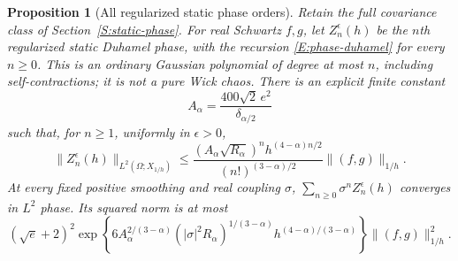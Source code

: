 \documentclass[12pt]{article}
\numberwithin{equation}{section}
\newtheorem{proposition}[theorem]{Proposition}
\theoremstyle{definition}
\begin{document}
\begin{proposition}[All regularized static phase orders]
  \label{P:static-phase-all-orders}
  Retain the full covariance class of Section~\ref{S:static-phase}.
  For real Schwartz $f,g$, let $Z_n^\epsilon(h)$ be the $n$th
  regularized static Duhamel phase, with the recursion
  \eqref{E:phase-duhamel} for every $n\ge0$. This is an ordinary
  Gaussian polynomial of degree at most $n$, including self-contractions;
  it is not a pure Wick chaos.
  There is an explicit finite constant
  \[
    A_\alpha=\frac{400\sqrt2\,e^2}{\delta_{\alpha/2}}
  \]
  such that, for $n\ge1$, uniformly in $\epsilon>0$,
  \begin{equation}\label{E:all-static-phase-orders}
    \|Z_n^\epsilon(h)\|_{L^2(\Omega;X_{1/h})}
    \le
    \frac{(A_\alpha\sqrt{R_\alpha})^n
    h^{(4-\alpha)n/2}}{(n!)^{(3-\alpha)/2}}
    \|(f,g)\|_{1/h}.
  \end{equation}
  At every fixed positive smoothing and real coupling $\sigma$,
  $\sum_{n\ge0}\sigma^nZ_n^\epsilon(h)$ converges in $L^2$ phase.
  Its squared norm is at most
  \begin{equation}\label{E:all-static-phase-sum}
    (\sqrt e+2)^2
    \exp\left\{6A_\alpha^{2/(3-\alpha)}
    (|\sigma|^2R_\alpha)^{1/(3-\alpha)}
    h^{(4-\alpha)/(3-\alpha)}\right\}\|(f,g)\|_{1/h}^2.
  \end{equation}
\end{proposition}
\end{document}
